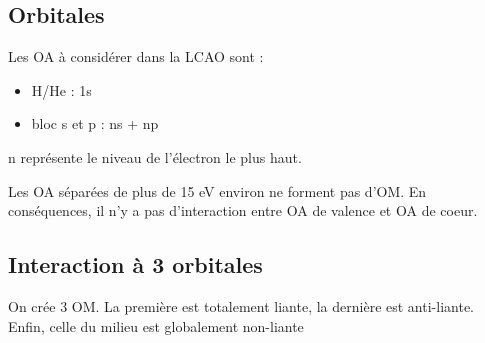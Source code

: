 \documentclass[french]{yLectureNote}
\begin{document}
\subsection{Orbitales}
Les OA à considérer dans la LCAO sont :
\begin{proposition}[OA à considérer]
\begin{itemize}
 \item H/He : 1s
 \item bloc s et p : ns + np
\end{itemize}
n représente le niveau de l'électron  le plus haut.
\end{proposition}
\begin{theorem}[Règle de 15 eV]
 Les OA séparées de plus de 15 eV environ ne forment pas d'OM. En conséquences, il n'y a pas d'interaction entre OA de valence et OA de coeur.
\end{theorem}
\subsection{Interaction à 3 orbitales}
On crée 3 OM. La première est totalement liante, la dernière est anti-liante. Enfin, celle du milieu est globalement non-liante
\end{document}
